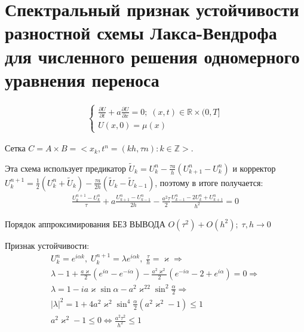 \documentclass[__main__.tex]{subfiles}
\begin{document}
\section{Спектральный признак устойчивости разностной схемы Лакса-Вендрофа для численного решения одномерного уравнения переноса}

\begin{gather*}
	\begin{cases}
	\frac{\partial U}{\partial t}+a\frac{\partial U}{\partial x}=0;\; (x,t)\in\mathbb{R}\times(0,T]\\
	U(x,0)=\mu(x)
	\end{cases}
\end{gather*}

Сетка $C=A\times B=<x_k,t^n=(kh,\tau n):k\in\mathbb{Z}>.$

Эта схема использует предикатор $\tilde{U}_k=U_k^n-\frac{\tau a}{h}(U_{k+1}^n-U_k^n)$ и корректор $U_k^{n+1}=\frac{1}{2}(U_k^n+\tilde{U}_k)-\frac{\tau a}{2h}(\tilde{U}_k-\tilde{U}_{k-1})$, поэтому в итоге получается:
\begin{gather*}
\frac{U_k^{n+1}-U_k^n}{\tau}+a\frac{U_{k+1}^n-U_{k-1}^n}{2h}-\frac{a^2\tau}{2}\frac{U_{k-1}^n-2U_k^n+U_{k+1}^n}{h^2}=0
\end{gather*}

Порядок аппроксимирования БЕЗ ВЫВОДА $O(\tau^2)+O(h^2);\;\tau,h \rightarrow 0$

Признак устойчивости:
\begin{gather*}
	U_{k}^{n}=e^{i\alpha k},\;U_k^{n+1}=\lambda e^{i\alpha k},\; \frac{\tau}{h}=\varkappa\Rightarrow\\
	\lambda-1+\frac{a\varkappa}{2}(e^{i\alpha}-e^{-i\alpha})-\frac{a^2\varkappa^2}{2}(e^{-i\alpha}-2+e^{i\alpha})=0\Rightarrow\\
	\lambda=1-ia\varkappa\sin\alpha-a^2\varkappa^22\sin^2\frac{\alpha}{2}\Rightarrow\\
	|\lambda|^2=1+4a^2\varkappa^2\sin^4\frac{\alpha}{2}(a^2\varkappa^2-1)\le 1\\
	a^2\varkappa^2-1\le 0\Leftrightarrow \frac{a^2\tau^2}{h^2}\le 1
\end{gather*}
\end{document}
